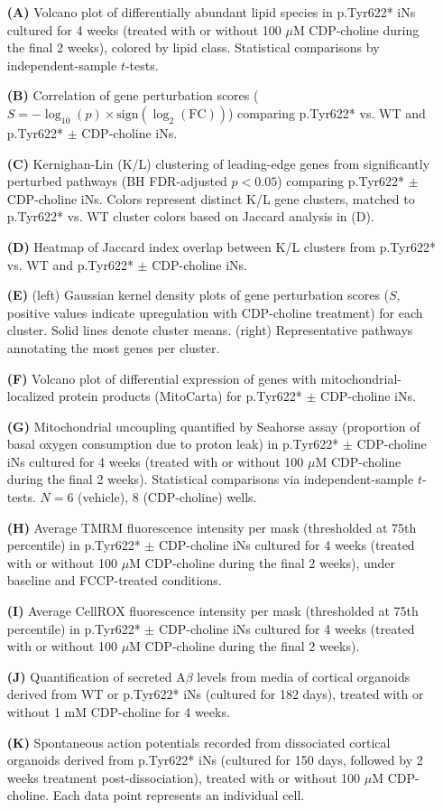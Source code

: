 \begin{itemize}
    \item[\textbf{(A)}] Volcano plot of differentially abundant lipid species in p.Tyr622* iNs cultured for 4 weeks (treated with or without 100 $\mu$M CDP-choline during the final 2 weeks), colored by lipid class.  Statistical comparisons by independent-sample $t$-tests.
    \item[\textbf{(B)}] Correlation of gene perturbation scores ($S = -\log_{10}(p)\times\text{sign}(\log_2(\text{FC}))$) comparing p.Tyr622* vs. WT and p.Tyr622* $\pm$ CDP-choline iNs.
    \item[\textbf{(C)}] Kernighan-Lin (K/L) clustering of leading-edge genes from significantly perturbed pathways (BH FDR-adjusted $p<0.05$) comparing p.Tyr622* $\pm$ CDP-choline iNs. Colors represent distinct K/L gene clusters, matched to p.Tyr622* vs. WT cluster colors based on Jaccard analysis in (D).
    \item[\textbf{(D)}] Heatmap of Jaccard index overlap between K/L clusters from p.Tyr622* vs. WT and p.Tyr622* $\pm$ CDP-choline iNs.
    \item[\textbf{(E)}] (left) Gaussian kernel density plots of gene perturbation scores ($S$, positive values indicate upregulation with CDP-choline treatment) for each cluster. Solid lines denote cluster means. (right) Representative pathways annotating the most genes per cluster.
    \item[\textbf{(F)}] Volcano plot of differential expression of genes with mitochondrial-localized protein products (MitoCarta) for p.Tyr622* $\pm$ CDP-choline iNs.
    \item[\textbf{(G)}] Mitochondrial uncoupling quantified by Seahorse assay (proportion of basal oxygen consumption due to proton leak) in p.Tyr622* $\pm$ CDP-choline iNs cultured for 4 weeks (treated with or without 100 $\mu$M CDP-choline during the final 2 weeks). Statistical comparisons via independent-sample $t$-tests. $N=6$ (vehicle), $8$ (CDP-choline) wells.
    \item[\textbf{(H)}] Average TMRM fluorescence intensity per mask (thresholded at 75th percentile) in p.Tyr622* $\pm$ CDP-choline iNs cultured for 4 weeks (treated with or without 100 $\mu$M CDP-choline during the final 2 weeks), under baseline and FCCP-treated conditions.
    \item[\textbf{(I)}] Average CellROX fluorescence intensity per mask (thresholded at 75th percentile) in p.Tyr622* $\pm$ CDP-choline iNs cultured for 4 weeks (treated with or without 100 $\mu$M CDP-choline during the final 2 weeks).
    \item[\textbf{(J)}] Quantification of secreted A$\beta$ levels from media of cortical organoids derived from WT or p.Tyr622* iNs (cultured for 182 days), treated with or without 1 mM CDP-choline for 4 weeks.
    \item[\textbf{(K)}] Spontaneous action potentials recorded from dissociated cortical organoids derived from p.Tyr622* iNs (cultured for 150 days, followed by 2 weeks treatment post-dissociation), treated with or without 100 $\mu$M CDP-choline. Each data point represents an individual cell.
\end{itemize}